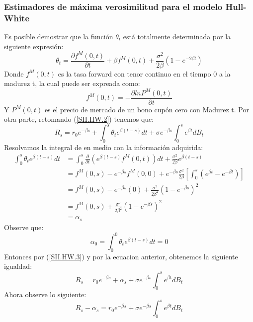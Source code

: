\documentclass[11pt,notitlepage]{article}
\begin{document}
    \subsubsection{Estimadores de máxima verosimilitud para el modelo Hull-White}
    Es posible demostrar que la función \(\theta_t\) está totalmente determinada por la siguiente expresión: 
    \begin{equation}\label{SII.HW.3}
        \theta_t = \frac{\partial f^{M}(0,t)}{\partial t} + \beta f^{M}(0,t) + \frac{\sigma^2}{2\beta}\left(1 - e^{-2\beta t} \right)
    \end{equation}
    Donde \(f^{M}(0,t)\) es la tasa forward con tenor continuo en el tiempo 0 a la madurez t, la cual puede ser expreada como:
    \[
       f^{M}(0,t) = -\frac{\partial lnP^{M}(0,t)}{\partial t}
    \]
    Y \(P^{M}(0,t)\) es el precio de mercado de un bono cupón cero con Madurez t. Por otra parte, retomando (\ref{SII.HW.2}) tenemos que: 
    \[
       R_s  = r_0e^{-\beta s} + \int_{0}^{s}\theta_{t}e^{\beta(t-s)}dt + \sigma e^{-\beta s}\int_{0}^{s}e^{\beta t}dB_t
    \]
    Resolvamos la integral de en medio con la información adquirida: 
    \begin{align*}
        \int_{0}^{s}\theta_{t}e^{\beta(t-s)}dt &=  \int_{0}^{s}\frac{\partial}{\partial t}\left(e^{\beta(t-s)}f^{M}(0,t)\right)dt
        +\frac{\sigma^2}{2\beta}e^{\beta(t-s)}\\
        &= f^{M}(0,s) - e^{-\beta s}f^{M}(0,0) + e^{-\beta s}\frac{\sigma^2}{2\beta}\left[\int_{0}^{s}\left(e^{\beta t}- e^{-\beta t} \right) \right]\\
        &= f^{M}(0,s) - e^{-\beta s}(0) + \frac{\sigma^2}{2\beta^2}(1 - e^{-\beta s})^{2}\\
        &= f^{M}(0,s) + \frac{\sigma^2}{2\beta^2}(1 - e^{-\beta s})^{2}\\
        &= \alpha_{s}
    \end{align*}
    Observe que: 
    \begin{equation}\label{SII.HW.4}
     \alpha_0 = \int_{0}^{0}\theta_{t}e^{\beta(t-s)}dt = 0
    \end{equation}
    Entonces por (\ref{SII.HW.3}) y por la ecuacion anterior, obtenemos la siguiente igualdad: 
    \begin{equation*}
        R_s  = r_0e^{-\beta s} + \alpha_{s} + \sigma e^{-\beta s}\int_{0}^{s}e^{\beta t}dB_t
    \end{equation*}
    Ahora observe lo siguiente: 
    \begin{equation}\label{SII.HW.5}
        R_s - \alpha_{s} = r_0e^{-\beta s} + \sigma e^{-\beta s}\int_{0}^{s}e^{\beta t}dB_t
    \end{equation}
\end{document}
